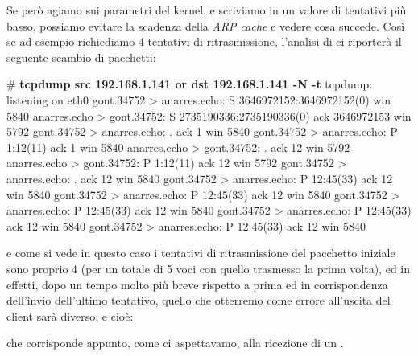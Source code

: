 Se però agiamo sui parametri del kernel, e scriviamo in 
un valore di tentativi più basso, possiamo evitare la scadenza della
\textit{ARP cache} e vedere cosa succede. Così se ad esempio richiediamo 4
tentativi di ritrasmissione, l'analisi di  ci riporterà il
seguente scambio di pacchetti:
\begin{Console}
# \textbf{tcpdump src 192.168.1.141 or dst 192.168.1.141 -N -t}
tcpdump: listening on eth0
gont.34752 > anarres.echo: S 3646972152:3646972152(0) win 5840
anarres.echo > gont.34752: S 2735190336:2735190336(0) ack 3646972153 win 5792 
gont.34752 > anarres.echo: . ack 1 win 5840 
gont.34752 > anarres.echo: P 1:12(11) ack 1 win 5840
anarres.echo > gont.34752: . ack 12 win 5792 
anarres.echo > gont.34752: P 1:12(11) ack 12 win 5792 
gont.34752 > anarres.echo: . ack 12 win 5840 
gont.34752 > anarres.echo: P 12:45(33) ack 12 win 5840 
gont.34752 > anarres.echo: P 12:45(33) ack 12 win 5840 
gont.34752 > anarres.echo: P 12:45(33) ack 12 win 5840 
gont.34752 > anarres.echo: P 12:45(33) ack 12 win 5840 
gont.34752 > anarres.echo: P 12:45(33) ack 12 win 5840 
\end{Console}
e come si vede in questo caso i tentativi di ritrasmissione del pacchetto
iniziale sono proprio 4 (per un totale di 5 voci con quello trasmesso la prima
volta), ed in effetti, dopo un tempo molto più breve rispetto a prima ed in
corrispondenza dell'invio dell'ultimo tentativo, quello che otterremo come
errore all'uscita del client sarà diverso, e cioè:
che corrisponde appunto, come ci aspettavamo, alla ricezione di un
.

